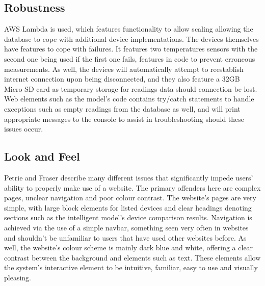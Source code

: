\documentclass[]{report}
\begin{document}
	
	\subsection{Robustness}
	AWS Lambda is used, which features functionality to allow scaling\cite{awslambdadocs} allowing the database to cope with additional device implementations. The devices themselves have features to cope with failures. It features two temperatures sensors with the second one being used if the first one fails, features in code to prevent erroneous measurements. As well, the devices will automatically attempt to reestablish internet connection upon being disconnected, and they also feature a 32GB Micro-SD card as temporary storage for readings data should connection be lost. Web elements such as the model's code contains try/catch statements to handle exceptions such as empty readings from the database as well, and will print appropriate messages to the console to assist in troubleshooting should these issues occur.
	
	\subsection{Look and Feel}
	Petrie and Fraser\cite{petrie2004tension} describe many different issues that significantly impede users' ability to properly make use of a website. The primary offenders here are complex pages, unclear navigation and poor colour contrast. The website's pages are very simple, with large block elements for listed devices and clear headings denoting sections such as the intelligent model's device comparison results. Navigation is achieved via the use of a simple navbar, something seen very often in websites and shouldn't be unfamiliar to users that have used other websites before. As well, the website's colour scheme is mainly dark blue and white, offering a clear contrast between the background and elements such as text. These elements allow the system's interactive element to be intuitive, familiar, easy to use and visually pleasing.
	
\end{document}
